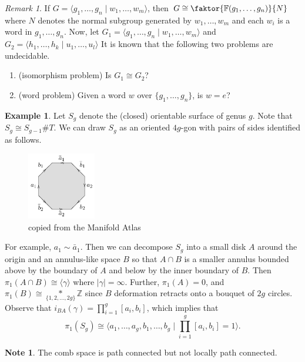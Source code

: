 \documentclass[10pt,letterpaper,cm]{nupset}
\theoremstyle{definition}
\newtheorem{exmp}[definition]{Example}
\newtheorem{note}[definition]{Note}
\theoremstyle{theorem}
\theoremstyle{remark}
\newtheorem{remark}[definition]{Remark}
\newcommand{\F}{\mathbb F}
\newcommand{\Z}{\mathbb Z}
\newcommand{\1}{\mathbb{1}}
\newcommand{\0}{\vec 0}
\begin{document}
\begin{remark} If $G = \langle g_1, \ldots, g_n \mid w_1, \ldots, w_m \rangle$, then $G \cong \faktor{\F(g_1, \ldots, g_n)}{N}$ where $N$ denotes the normal subgroup generated by $w_1, \ldots, w_m$ and each $w_i$ is a word in $g_1, \ldots, g_n$. 
Now, let $G_1 = \langle g_1, \ldots, g_n \mid w_1, \ldots, w_m \rangle$ and $G_2 = \langle h_1, \ldots, h_k \mid u_1, \ldots, u_l \rangle$
It is known that the following two problems are undecidable.
\begin{enumerate}[label=(\alph*)]
\item{(isomorphism problem)} Is $G_1 \cong G_2$?
\item {(word problem)} Given a word $w$ over $\{g_1, \ldots, g_n\}$, is $w=e$? 
\end{enumerate}
\end{remark}

\begin{exmp}
Let $S_g$ denote the (closed) orientable surface of genus $g$. Note that $S_g \cong S_{g-1} \# T$. We can draw $S_g$ as an oriented  $4g$-gon with pairs of sides identified as follows.
\begin{figure}[H]
\centering
\includegraphics[width=30mm]{polygon-Sg.png}
\caption{copied from the Manifold Atlas} \label{overflow}
\end{figure} For example, $a_1 \sim \bar{a}_1$. 
Then we can decompose $S_g$ into a small disk $A$ around the origin and an annulus-like space $B$ so that $A \cap B$ is a smaller annulus bounded above by the boundary of $A$ and below by the inner boundary of $B$. Then $\pi_1(A \cap B) \cong \langle \gamma \rangle$ where $|\gamma| =\infty$. Further, $\pi_1(A) = 0$, and $\pi_1(B) \cong \underset{\{1,2, \ldots, 2g\}}{\ast} \Z$ since $B$ deformation retracts onto a bouquet of $2g$ circles. Observe that $i_{BA}(\gamma) = \prod_{i=1}^{g}[a_i, b_i]$, which implies that $$ \pi_1(S_g) \cong \big \langle a_1, \ldots, a_g, b_1, \ldots, b_g \mid    \prod_{i=1}^{g}[a_i, b_i] =1 \big  \rangle .$$
\end{exmp}

\begin{note}
The comb space is path connected but not locally path connected. 
\end{note}
\end{document}
